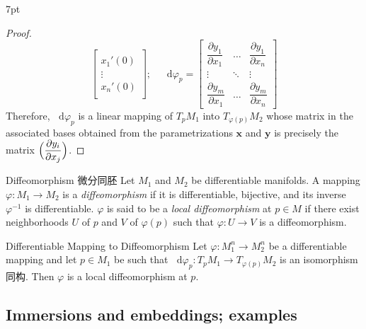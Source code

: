 \documentclass[
	border={25mm 20mm 25mm 30mm},  %
	varwidth,  %
]{standalone}
\newcommand\dd{\mathop{}\!\mathrm{d}}%
\newenvironment{purpleformal}{%
\def\FrameCommand{%
\hspace{1pt}%
{\color{purpleframeshade}\vrule width 2pt}%
{\color{purpleformalshade}\vrule width 4pt}%
\colorbox{purpleformalshade}%
}%
\MakeFramed{\advance\hsize-\width\FrameRestore}%
\noindent\hspace{-4.55pt}%
\begin{adjustwidth}{}{7pt}%
\vspace{1pt}\vspace{1pt}%
}
{%
\vspace{5pt}\end{adjustwidth}\endMakeFramed%
}
\begin{document}
\begin{purpleformal}
\begin{proof}
\[            \begin{bmatrix}
                \\[-6pt]
                x_1'(0) \\[4pt]
                \vdots  \\[6pt]
                x_n'(0) \\[4pt]
            \end{bmatrix}
            ;\quad\dd\varphi_p=\begin{bmatrix}
                \dfrac{\partial y_1}{\partial x_1} & \ldots & \dfrac{\partial y_1}{\partial x_n} \\
                \vdots                             & \ddots & \vdots                             \\
                \dfrac{\partial y_m}{\partial x_1} & \ldots & \dfrac{\partial y_m}{\partial x_n}
            \end{bmatrix}\]
        Therefore, \(\dd\varphi_p\) is a linear mapping of \(T_p M_1\) into \(T_{\varphi(p)} M_2\) whose matrix in the associated bases obtained from the parametrizations \(\mathbf{x}\) and \(\mathbf{y}\) is precisely the matrix \(\Bigl(\dfrac{\partial y_i}{\partial x_j}\Bigr)\).
    \end{proof}
\end{purpleformal}

\begin{tips}{Diffeomorphism 微分同胚}
    Let \(M_1\) and \(M_2\) be differentiable manifolds. A mapping \(\varphi:M_1\to M_2\) is a \textsl{diffeomorphism} if it is differentiable, bijective, and its inverse \(\varphi^{-1}\) is differentiable. \(\varphi\) is said to be a \textsl{local diffeomorphism} at \(p\in M\) if there exist neighborhoods \(U\) of \(p\) and \(V\) of \(\varphi(p)\) such that \(\varphi:U\to V\) is a diffeomorphism.
\end{tips}

\begin{tips}{Differentiable Mapping to Diffeomorphism}
    Let \(\varphi:M_1^n\to M_2^n\) be a differentiable mapping and let \(p\in M_1\) be such that \(\dd\varphi_p:T_pM_1\to T_{\varphi(p)}M_2\) is an isomorphism同构. Then \(\varphi\) is a local diffeomorphism at \(p\).
\end{tips}

\subsection{Immersions and embeddings; examples}
\end{document}
